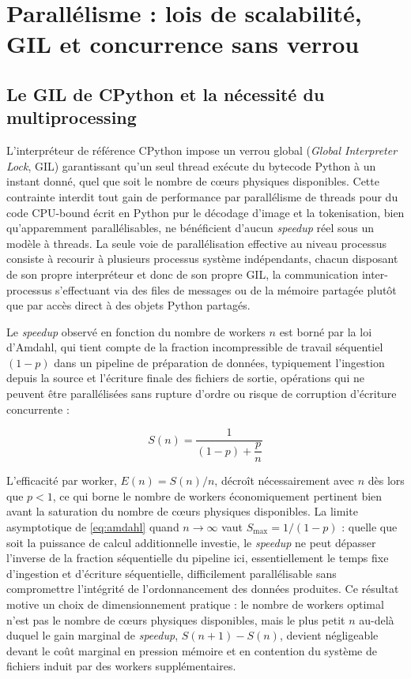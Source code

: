 \documentclass[12pt,a4paper]{report}
\begin{document}
\section{Parallélisme : lois de scalabilité, GIL et concurrence sans verrou}
\label{sec:parallelisme}

\subsection{Le GIL de CPython et la nécessité du multiprocessing}

L'interpréteur de référence CPython impose un verrou global (\textit{Global Interpreter Lock}, GIL) garantissant qu'un seul thread exécute du bytecode Python à un instant donné, quel que soit le nombre de cœurs physiques disponibles. Cette contrainte interdit tout gain de performance par parallélisme de threads pour du code CPU-bound écrit en Python pur le décodage d'image et la tokenisation, bien qu'apparemment parallélisables, ne bénéficient d'aucun \textit{speedup} réel sous un modèle à threads. La seule voie de parallélisation effective au niveau processus consiste à recourir à plusieurs processus système indépendants, chacun disposant de son propre interpréteur et donc de son propre GIL, la communication inter-processus s'effectuant via des files de messages ou de la mémoire partagée plutôt que par accès direct à des objets Python partagés.

Le \textit{speedup} observé en fonction du nombre de workers $n$ est borné par la loi d'Amdahl, qui tient compte de la fraction incompressible de travail séquentiel $(1-p)$ dans un pipeline de préparation de données, typiquement l'ingestion depuis la source et l'écriture finale des fichiers de sortie, opérations qui ne peuvent être parallélisées sans rupture d'ordre ou risque de corruption d'écriture concurrente :

\begin{equation}
\label{eq:amdahl}
S(n) = \frac{1}{(1-p) + \dfrac{p}{n}}
\end{equation}

L'efficacité par worker, $E(n) = S(n)/n$, décroît nécessairement avec $n$ dès lors que $p < 1$, ce qui borne le nombre de workers économiquement pertinent bien avant la saturation du nombre de cœurs physiques disponibles. La limite asymptotique de \eqref{eq:amdahl} quand $n \to \infty$ vaut $S_{\max} = 1/(1-p)$ : quelle que soit la puissance de calcul additionnelle investie, le \textit{speedup} ne peut dépasser l'inverse de la fraction séquentielle du pipeline ici, essentiellement le temps fixe d'ingestion et d'écriture séquentielle, difficilement parallélisable sans compromettre l'intégrité de l'ordonnancement des données produites. Ce résultat motive un choix de dimensionnement pratique : le nombre de workers optimal n'est pas le nombre de cœurs physiques disponibles, mais le plus petit $n$ au-delà duquel le gain marginal de \textit{speedup}, $S(n+1) - S(n)$, devient négligeable devant le coût marginal en pression mémoire et en contention du système de fichiers induit par des workers supplémentaires.
\end{document}

